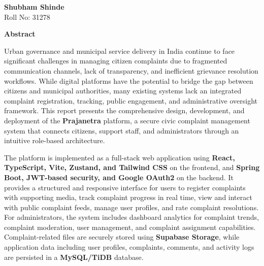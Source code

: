 \documentclass[12pt,a4paper]{report}
\begin{document}
\vspace{1.5in}

\begin{flushright}
\textbf{Shubham Shinde}\\
Roll No: 31278
\end{flushright}

\newpage
\begin{center}
    \begin{LARGE}
        \textbf{Abstract}
    \end{LARGE}
\end{center}
\vspace{0.2in}

\noindent
Urban governance and municipal service delivery in India continue to face significant challenges in managing citizen complaints due to fragmented communication channels, lack of transparency, and inefficient grievance resolution workflows. While digital platforms have the potential to bridge the gap between citizens and municipal authorities, many existing systems lack an integrated complaint registration, tracking, public engagement, and administrative oversight framework. This report presents the comprehensive design, development, and deployment of the \textbf{Prajanetra} platform, a secure civic complaint management system that connects citizens, support staff, and administrators through an intuitive role-based architecture.

The platform is implemented as a full-stack web application using \textbf{React, TypeScript, Vite, Zustand, and Tailwind CSS} on the frontend, and \textbf{Spring Boot, JWT-based security, and Google OAuth2} on the backend. It provides a structured and responsive interface for users to register complaints with supporting media, track complaint progress in real time, view and interact with public complaint feeds, manage user profiles, and rate complaint resolutions. For administrators, the system includes dashboard analytics for complaint trends, complaint moderation, user management, and complaint assignment capabilities. Complaint-related files are securely stored using \textbf{Supabase Storage}, while application data including user profiles, complaints, comments, and activity logs are persisted in a \textbf{MySQL/TiDB} database.
\end{document}
